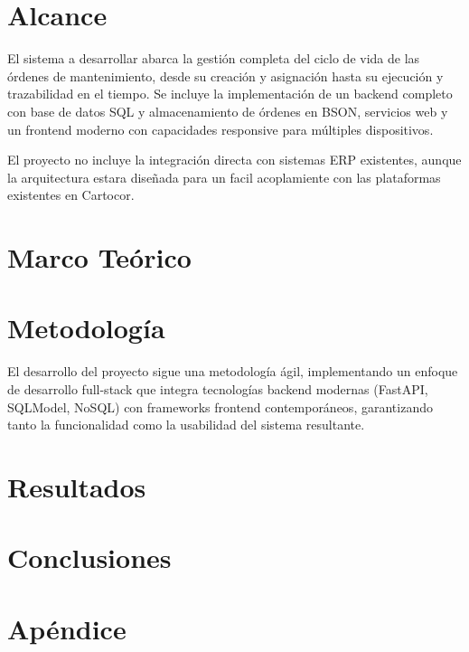 \documentclass[12pt,a4paper]{report}
\begin{document}
\chapter*{Alcance}
El sistema a desarrollar abarca la gestión completa del ciclo de vida de las órdenes de mantenimiento, desde su creación y asignación hasta su ejecución y trazabilidad en el tiempo. Se incluye la implementación de un backend completo con base de datos SQL y almacenamiento de órdenes en BSON, servicios web y un frontend moderno con capacidades responsive para múltiples dispositivos.

El proyecto no incluye la integración directa con sistemas ERP existentes, aunque la arquitectura estara diseñada para un facil acoplamiente con las plataformas existentes en Cartocor.

\chapter*{Marco Teórico}


\chapter*{Metodología}
El desarrollo del proyecto sigue una metodología ágil, implementando un enfoque de desarrollo full-stack que integra tecnologías backend modernas (FastAPI, SQLModel, NoSQL) con frameworks frontend contemporáneos, garantizando tanto la funcionalidad como la usabilidad del sistema resultante.

\chapter*{Resultados}


\chapter*{Conclusiones}


\appendix
\chapter*{Apéndice}
\end{document}
